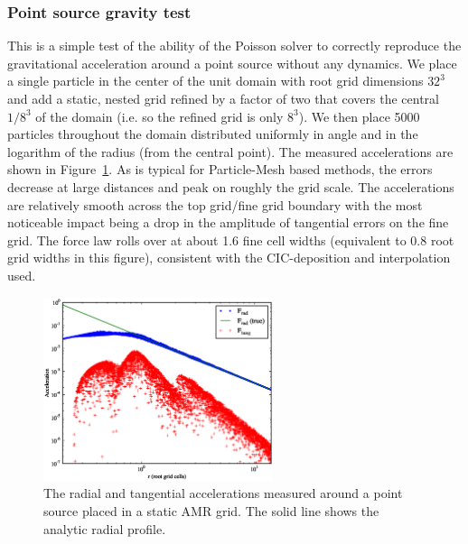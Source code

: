 \subsubsection{Point source gravity test}
\label{sec.test.gravitypointsource}

This is a simple test of the ability of the Poisson solver to
correctly reproduce the gravitational acceleration around a point source without any
dynamics.  We place a single particle in the center of the unit domain
with root grid dimensions $32^3$ and add a static, nested grid 
refined by a factor of two that covers the central $1/8^3$ of the
domain (i.e. so the refined grid is only $8^3$).  We then place 5000
particles throughout the domain distributed uniformly in angle and
in the logarithm of the radius (from the central point).  The
measured accelerations are shown in Figure~\ref{fig.gravitytest}.  As
is typical for Particle-Mesh based methods, the errors decrease at
large distances and peak on roughly the grid scale.  The accelerations
are relatively smooth across the top grid/fine grid boundary with the
most noticeable impact being a drop in the amplitude of tangential
errors on the fine grid.  The force law rolls over at about 1.6 fine
cell widths (equivalent to 0.8 root grid widths in this figure),
consistent with the CIC-deposition and interpolation used.

\begin{figure}
\begin{center}
\includegraphics[width=0.6\textwidth]{figures/GravityTest.eps}
\caption{The radial and tangential accelerations measured around a point source placed in a static AMR grid.  The solid line shows the analytic radial profile.}
\label{fig.gravitytest}
\end{center}
\end{figure}

